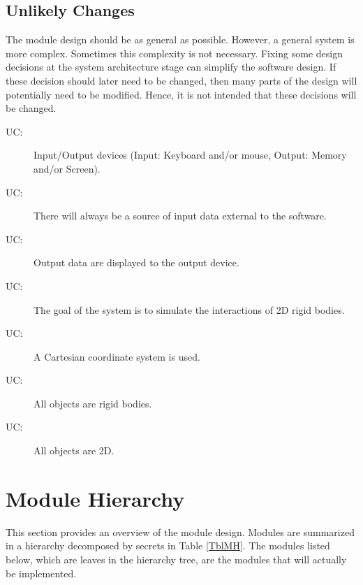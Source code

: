 \documentclass[12pt]{article}
\newcounter{ucnum}
\newcommand{\uctheucnum}{UC\theucnum}
\begin{document}
\subsection{Unlikely Changes} \label{SecUchange}

The module design should be as general as possible. However, a general system is
more complex. Sometimes this complexity is not necessary. Fixing some design
decisions at the system architecture stage can simplify the software design. If
these decision should later need to be changed, then many parts of the design
will potentially need to be modified. Hence, it is not intended that these
decisions will be changed. 

\begin{description}
\item[ \uctheucnum \label{ucIO}:] Input/Output devices
  (Input: Keyboard and/or mouse, Output: Memory and/or Screen).
\item[ \uctheucnum \label{ucInput}:] There will always be a source of input data external to the software.
\item[ \uctheucnum \label{ucOutput}:] Output data are
  displayed to the output device.
\item[ \uctheucnum \label{ucGoal}:] The goal of the system is to simulate the interactions of 2D rigid bodies.
\item[ \uctheucnum \label{ucCartesian}:] A Cartesian 
coordinate system is used.
\item[ \uctheucnum \label{ucRigid}:] All objects
are rigid bodies.
\item[ \uctheucnum \label{uc2D}:] All objects
are 2D.
\end{description}

\section{Module Hierarchy} \label{SecMH}

This section provides an overview of the module design. Modules are summarized
in a hierarchy decomposed by secrets in Table \ref{TblMH}. The modules listed
below, which are leaves in the hierarchy tree, are the modules that will
actually be implemented.
\end{document}
